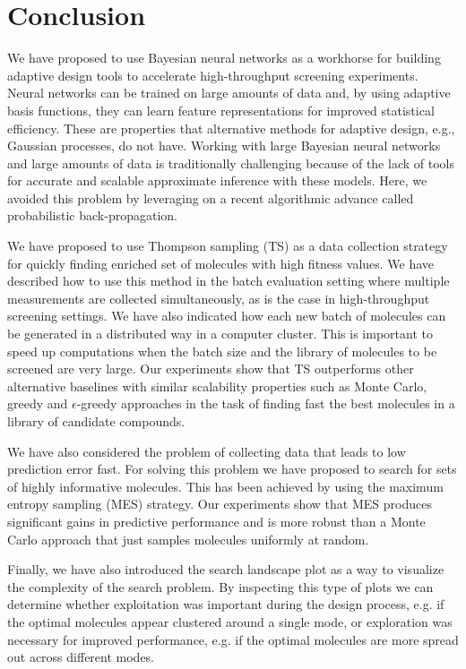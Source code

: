 \section{Conclusion}

We have proposed to use Bayesian neural networks as a workhorse for building adaptive design tools to accelerate high-throughput screening experiments. Neural networks can be trained on large amounts of data and, by using adaptive basis functions, they can learn feature representations for improved statistical efficiency. These are properties that alternative methods for adaptive design, e.g., Gaussian processes, do not have. Working with large Bayesian neural networks and large amounts of data is traditionally challenging because of the lack of tools for accurate and scalable approximate inference with these models. Here, we avoided this problem by leveraging on a recent algorithmic advance called probabilistic back-propagation.

We have proposed to use Thompson sampling (TS) as a data collection strategy for quickly finding enriched set of molecules with high fitness values. We have described how to use this method in the batch evaluation setting where multiple measurements are collected simultaneously, as is the case in high-throughput screening settings. We have also indicated how each new batch of molecules can be generated in a distributed way in a computer cluster. This is important to speed up computations when the batch size and the library of molecules to be screened are very large. Our experiments show that TS outperforms other alternative baselines with similar scalability properties such as Monte Carlo, greedy and $\epsilon$-greedy approaches in the task of finding fast the best molecules in a library of candidate compounds.

We have also considered the problem of collecting data that leads to low prediction error fast. For solving this problem we have proposed to search for sets of highly informative molecules. This has been achieved by using the maximum entropy sampling (MES) strategy. Our experiments show that MES produces significant gains in predictive performance and is more robust than a Monte Carlo approach that just samples molecules uniformly at random.

Finally, we have also introduced the search landscape plot as a way to visualize the complexity of the search problem. By inspecting this type of plots we can determine whether exploitation was important during the design process, e.g. if the optimal molecules appear clustered around a single mode, or exploration was necessary for improved performance, e.g. if the optimal molecules are more spread out across different modes.